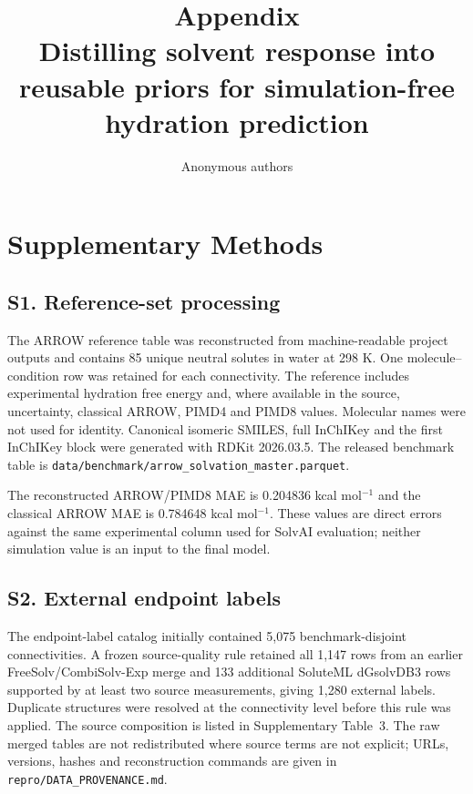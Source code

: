 \documentclass[10pt]{article}
\title{Appendix\\[0.4em]
\large Distilling solvent response into reusable priors for simulation-free hydration prediction}
\author{Anonymous authors}
\date{}
\begin{document}
\pagestyle{empty}
\maketitle
\thispagestyle{empty}
\tableofcontents

\section*{Supplementary Methods}

\subsection*{S1. Reference-set processing}

The ARROW reference table was reconstructed from machine-readable project outputs and
contains 85 unique neutral solutes in water at 298 K. One molecule--condition row was
retained for each connectivity. The reference includes experimental hydration free
energy and, where available in the source, uncertainty, classical ARROW, PIMD4 and
PIMD8 values. Molecular names were not used for identity. Canonical isomeric SMILES,
full InChIKey and the first InChIKey block were generated with RDKit 2026.03.5. The
released benchmark table is \texttt{data/benchmark/arrow\_solvation\_master.parquet}.

The reconstructed ARROW/PIMD8 MAE is 0.204836 kcal mol$^{-1}$ and the classical
ARROW MAE is 0.784648 kcal mol$^{-1}$. These values are direct errors against the same
experimental column used for SolvAI evaluation; neither simulation value is an input
to the final model.

\subsection*{S2. External endpoint labels}

The endpoint-label catalog initially contained 5,075 benchmark-disjoint
connectivities. A frozen source-quality rule retained all 1,147 rows from an earlier
FreeSolv/CombiSolv-Exp merge and 133 additional SoluteML dGsolvDB3 rows supported by
at least two source measurements, giving 1,280 external labels. Duplicate structures
were resolved at the connectivity level before this rule was applied. The source
composition is listed in Supplementary Table~3. The raw merged tables are not
redistributed where source terms are not explicit; URLs, versions, hashes and
reconstruction commands are given in \texttt{repro/DATA\_PROVENANCE.md}.
\end{document}
